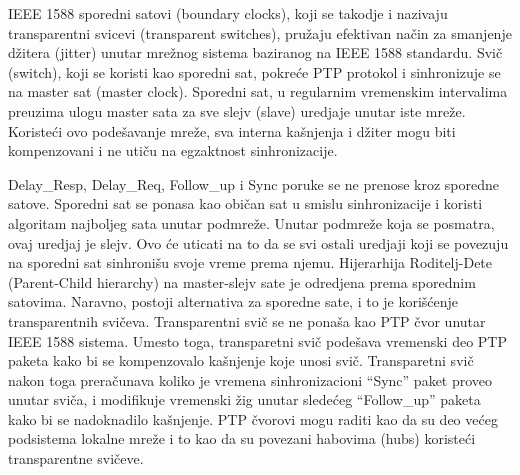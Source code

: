 \documentclass[a4paper,12pt, master]{etf}
\begin{document}
	IEEE 1588 sporedni satovi (boundary clocks), koji se takodje i nazivaju
	transparentni svicevi (transparent switches), pru\v{z}aju efektivan na\v{c}in za
	smanjenje d\v{z}itera (jitter) unutar mre\v{z}nog sistema baziranog na IEEE 1588
	standardu. Svi\v{c} (switch), koji se koristi kao sporedni sat, pokre\'{c}e PTP protokol i
	sinhronizuje se na master sat (master clock). Sporedni sat, u regularnim vremenskim intervalima
	preuzima ulogu master sata za sve slejv (slave) uredjaje unutar iste mre\v{z}e.
        Koriste\'{c}i ovo pode\v{s}avanje mre\v{z}e, sva interna ka\v{s}njenja i d\v{z}iter mogu biti
        kompenzovani i ne uti\v{c}u na egzaktnost sinhronizacije.

	Delay\_Resp, Delay\_Req, Follow\_up i Sync poruke se ne prenose kroz sporedne satove.
	Sporedni sat se ponasa kao obi\v{c}an sat u smislu sinhronizacije i koristi algoritam
	najboljeg sata unutar podmre\v{z}e. Unutar podmre\v{z}e koja se posmatra, ovaj uredjaj je slejv.
	Ovo \'{c}e uticati na to da se svi ostali uredjaji koji se povezuju na sporedni sat
	sinhroni\v{s}u svoje vreme prema njemu. Hijerarhija Roditelj-Dete (Parent-Child hierarchy) na
	master-slejv sate je odredjena prema sporednim satovima. Naravno, postoji alternativa za sporedne sate,
	i to je kori\v{s}\'{c}enje transparentnih svi\v{c}eva. Transparentni svi\v{c} se ne pona\v{s}a kao
	PTP \v{c}vor unutar IEEE 1588 sistema. Umesto toga, transparetni svi\v{c} pode\v{s}ava
	vremenski deo PTP paketa kako bi se kompenzovalo ka\v{s}njenje koje unosi svi\v{c}. Transparetni
	svi\v{c} nakon toga prera\v{c}unava koliko je vremena sinhronizacioni ``Sync'' paket proveo unutar
	svi\v{c}a, i modifikuje vremenski \v{z}ig unutar slede\'{c}eg ``Follow\_up'' paketa kako bi se
	nadoknadilo ka\v{s}njenje. PTP \v{c}vorovi mogu raditi kao da su deo ve\'{c}eg podsistema lokalne mre\v{z}e
	i to kao da su povezani habovima (hubs) koriste\'{c}i transparentne svi\v{c}eve.
\end{document}
